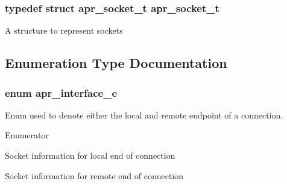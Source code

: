 \subsubsection[{\texorpdfstring{apr\+\_\+socket\+\_\+t}{apr_socket_t}}]{\setlength{\rightskip}{0pt plus 5cm}typedef struct {\bf apr\+\_\+socket\+\_\+t} {\bf apr\+\_\+socket\+\_\+t}}\hypertarget{group__apr__network__io_ga49262b223e7434746e1f1737659aa2c3}{}\label{group__apr__network__io_ga49262b223e7434746e1f1737659aa2c3}
A structure to represent sockets 

\subsection{Enumeration Type Documentation}
\subsubsection[{\texorpdfstring{apr\+\_\+interface\+\_\+e}{apr_interface_e}}]{\setlength{\rightskip}{0pt plus 5cm}enum {\bf apr\+\_\+interface\+\_\+e}}\hypertarget{group__apr__network__io_ga1982f44f48fdf00a8bd754bc7b773edc}{}\label{group__apr__network__io_ga1982f44f48fdf00a8bd754bc7b773edc}
Enum used to denote either the local and remote endpoint of a connection. \begin{Desc}
\item[Enumerator]\par
\begin{description}
\item[{\em 
A\+P\+R\+\_\+\+L\+O\+C\+AL\hypertarget{group__apr__network__io_gga1982f44f48fdf00a8bd754bc7b773edca6c23a4bf48b8f93dff08adf827382616}{}\label{group__apr__network__io_gga1982f44f48fdf00a8bd754bc7b773edca6c23a4bf48b8f93dff08adf827382616}
}]Socket information for local end of connection \item[{\em 
A\+P\+R\+\_\+\+R\+E\+M\+O\+TE\hypertarget{group__apr__network__io_gga1982f44f48fdf00a8bd754bc7b773edcaeb8be70b031f06a513ac0ebcaa5bac8a}{}\label{group__apr__network__io_gga1982f44f48fdf00a8bd754bc7b773edcaeb8be70b031f06a513ac0ebcaa5bac8a}
}]Socket information for remote end of connection \end{description}
\end{Desc}
